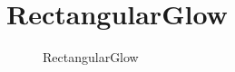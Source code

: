 ﻿




\FloatBarrier
\section{
RectangularGlow
}\label{c000015s000024}


\begin{figure}[htb] %
\marginnote{\setlength\fboxsep{2pt}\fbox{\footnotesize{\kaishu\figurename\,}\footnotesize{\ref{p000040}}}}\centering %
\setlength\fboxsep{0pt} %
\caption{RectangularGlow} %
\label{p000040} %
\end{figure}


